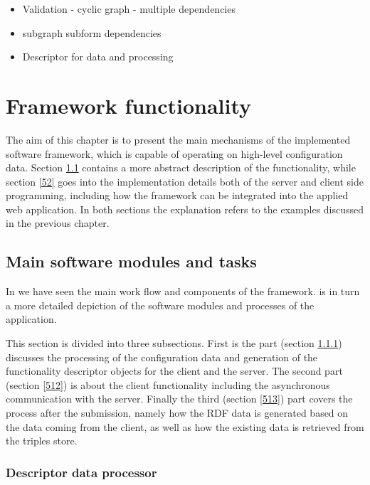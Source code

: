 \begin{itemize}	
	\item{Validation - cyclic graph - multiple dependencies}
	\item{subgraph subform dependencies}
	\item{Descriptor for data and processing}
\end{itemize}

\chapter{Framework functionality} \label{5}


The aim of this chapter is to present the main mechanisms of the implemented software framework, which is capable of operating on high-level configuration data. Section \ref{51} contains a more abstract description of the functionality, while section \ref{52} goes into the implementation details both of the server and client side programming, including how the framework can be integrated into the applied web application. In both sections the explanation refers to the examples discussed in the previous chapter.


\section{Main software modules and tasks} \label{51}


In  we have seen the main work flow and components of the framework.  is in turn a more detailed depiction of the software modules and processes of the application.




This section is divided into three subsections. First is the part (section \ref{511}) discusses the  processing of the configuration data and generation of the functionality descriptor objects for the client and the server. The second part (section \ref{512}) is about the client functionality including the asynchronous communication with the server. Finally the third (section \ref{513}) part covers the process after the submission, namely how the RDF data is generated based on the data coming from the client, as well as how the existing data is retrieved from the triples store.


\subsection{Descriptor data processor} \label{511}




